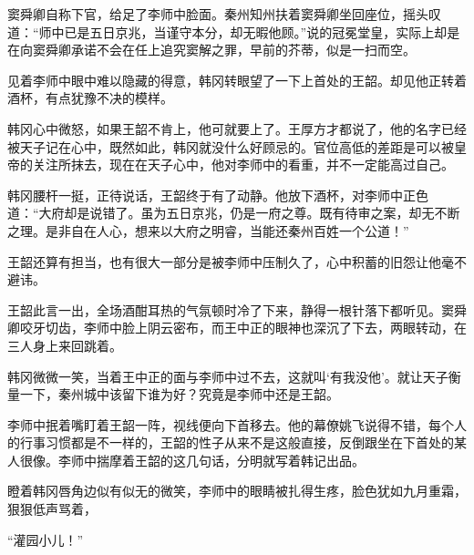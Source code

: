窦舜卿自称下官，给足了李师中脸面。秦州知州扶着窦舜卿坐回座位，摇头叹道：“师中已是五日京兆，当谨守本分，却无暇他顾。”说的冠冕堂皇，实际上却是在向窦舜卿承诺不会在任上追究窦解之罪，早前的芥蒂，似是一扫而空。

见着李师中眼中难以隐藏的得意，韩冈转眼望了一下上首处的王韶。却见他正转着酒杯，有点犹豫不决的模样。

韩冈心中微怒，如果王韶不肯上，他可就要上了。王厚方才都说了，他的名字已经被天子记在心中，既然如此，韩冈就没什么好顾忌的。官位高低的差距是可以被皇帝的关注所抹去，现在在天子心中，他对李师中的看重，并不一定能高过自己。

韩冈腰杆一挺，正待说话，王韶终于有了动静。他放下酒杯，对李师中正色道：“大府却是说错了。虽为五日京兆，仍是一府之尊。既有待审之案，却无不断之理。是非自在人心，想来以大府之明睿，当能还秦州百姓一个公道！”

王韶还算有担当，也有很大一部分是被李师中压制久了，心中积蓄的旧怨让他毫不避讳。

王韶此言一出，全场酒酣耳热的气氛顿时冷了下来，静得一根针落下都听见。窦舜卿咬牙切齿，李师中脸上阴云密布，而王中正的眼神也深沉了下去，两眼转动，在三人身上来回跳着。

韩冈微微一笑，当着王中正的面与李师中过不去，这就叫‘有我没他’。就让天子衡量一下，秦州城中该留下谁为好？究竟是李师中还是王韶。

李师中抿着嘴盯着王韶一阵，视线便向下首移去。他的幕僚姚飞说得不错，每个人的行事习惯都是不一样的，王韶的性子从来不是这般直接，反倒跟坐在下首处的某人很像。李师中揣摩着王韶的这几句话，分明就写着韩记出品。

瞪着韩冈唇角边似有似无的微笑，李师中的眼睛被扎得生疼，脸色犹如九月重霜，狠狠低声骂着，

“灌园小儿！”

